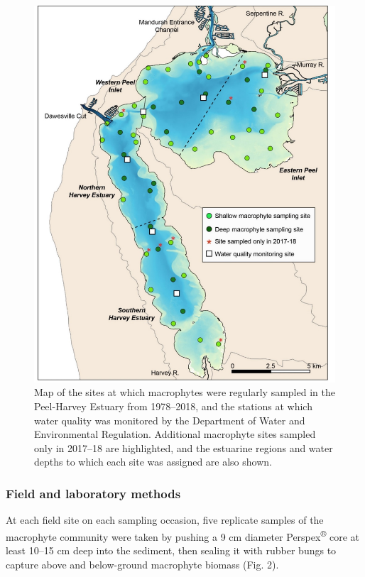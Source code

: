 \documentclass[
]{book}
\begin{document}
\begin{figure}
\includegraphics[width=1\linewidth]{images/macrophytes/picture4} \caption{Map of the sites at which macrophytes were regularly sampled in the Peel-Harvey Estuary from 1978–2018, and the stations at which water quality was monitored by the Department of Water and Environmental Regulation. Additional macrophyte sites sampled only in 2017–18 are highlighted, and the estuarine regions and water depths to which each site was assigned are also shown.}\label{fig:macrophytes-pic4}
\end{figure}

\hypertarget{field-and-laboratory-methods-1}{%
\subsubsection{Field and laboratory methods}\label{field-and-laboratory-methods-1}}

At each field site on each sampling occasion, five replicate samples of the macrophyte community were taken by pushing a 9 cm diameter Perspex\textsuperscript{®} core at least 10--15 cm deep into the sediment, then sealing it with rubber bungs to capture above and below-ground macrophyte biomass (Fig. 2).
\end{document}
